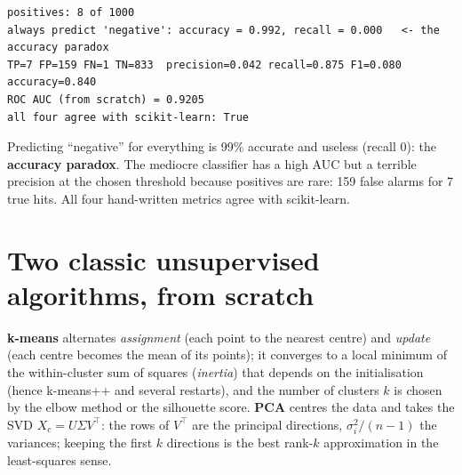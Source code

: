 \documentclass[10pt,a4paper,openany,oneside]{report}
\newcommand{\prio}[1]{\texorpdfstring{\ifcase#1\or{\color{gold}\ding{72}}\or{\color{gold}\ding{72}\ding{72}}\or{\color{gold}\ding{72}\ding{72}\ding{72}}\fi}{}}
\begin{document}
\begin{lstlisting}[style=out,basicstyle=\ttfamily\fontsize{7.2}{8.6}\selectfont,title={Captured output}]
positives: 8 of 1000
always predict 'negative': accuracy = 0.992, recall = 0.000   <- the accuracy paradox
TP=7 FP=159 FN=1 TN=833  precision=0.042 recall=0.875 F1=0.080 accuracy=0.840
ROC AUC (from scratch) = 0.9205
all four agree with scikit-learn: True
\end{lstlisting}
Predicting ``negative'' for everything is 99\% accurate and useless (recall 0): the \textbf{accuracy paradox}. The mediocre classifier has a high AUC but a terrible precision at the chosen threshold because positives are rare: 159 false alarms for 7 true hits. All four hand-written metrics agree with scikit-learn.

\section{Two classic unsupervised algorithms, from scratch \prio{2}}
\textbf{k-means} alternates \emph{assignment} (each point to the nearest centre) and \emph{update} (each centre becomes the mean of its points); it converges to a local minimum of the within-cluster sum of squares (\emph{inertia}) that depends on the initialisation (hence k-means++ and several restarts), and the number of clusters $k$ is chosen by the elbow method or the silhouette score. \textbf{PCA} centres the data and takes the SVD $X_c=U\Sigma V^\top$: the rows of $V^\top$ are the principal directions, $\sigma_i^2/(n-1)$ the variances; keeping the first $k$ directions is the best rank-$k$ approximation in the least-squares sense.
\end{document}
